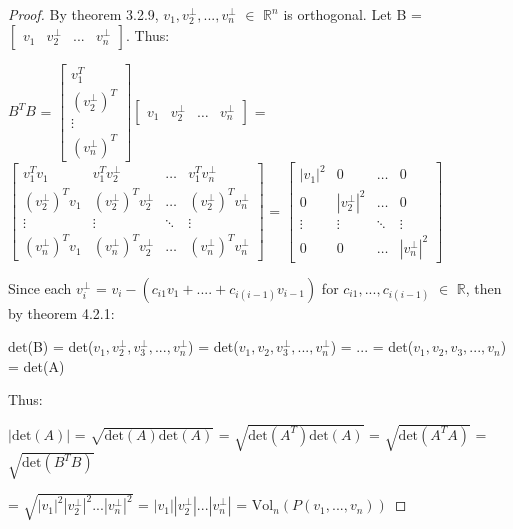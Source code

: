     \begin{proof}
        By {\color{red} theorem 3.2.9},
        $v_1,v_2^{\perp},...,v_n^{\perp}$ $\in$ $\mathbb{R}^n$
        is orthogonal.
        Let B =
        $\begin{bmatrix}
            v_1 & v_2^{\perp} & ... & v_n^{\perp}
        \end{bmatrix}$. Thus:

        \hspace{0.5cm}
        $B^TB$ =
        \scriptsize
        $\begin{bmatrix}
            v_1^T \\
            (v_2^{\perp})^T \\
            \vdots \\
            (v_n^{\perp})^T
        \end{bmatrix}
        \begin{bmatrix}
            v_1 & v_2^{\perp} & \hdots & v_n^{\perp}
        \end{bmatrix}$ =
        $\begin{bmatrix}
            v_1^Tv_1 & v_1^Tv_2^{\perp} & \hdots & v_1^Tv_n^{\perp} \\
            (v_2^{\perp})^Tv_1 & (v_2^{\perp})^Tv_2^{\perp}
                & \hdots & (v_2^{\perp})^Tv_n^{\perp} \\
            \vdots & \vdots & \ddots & \vdots \\
            (v_n^{\perp})^Tv_1 & (v_n^{\perp})^Tv_2^{\perp}
                & \hdots & (v_n^{\perp})^Tv_n^{\perp}
        \end{bmatrix}$ =
        $\begin{bmatrix}
            |v_1|^2 & 0 & \hdots & 0 \\
            0 & |v_2^{\perp}|^2 & \hdots & 0 \\
            \vdots & \vdots & \ddots & \vdots \\
            0 & 0 & \hdots & |v_n^{\perp}|^2
        \end{bmatrix}$
        \normalsize

        Since each $v_i^{\perp}$ = $v_i - (c_{i1}v_1 + .... + c_{i(i-1)}v_{i-1})$
        for $c_{i1},...,c_{i(i-1)}$ $\in$ $\mathbb{R}$, then
        by {\color{red} theorem 4.2.1}:

        \hspace{0.3cm}
        det(B)
        = det($v_1,v_2^{\perp},v_3^{\perp},...,v_n^{\perp}$)
        = det($v_1,v_2,v_3^{\perp},...,v_n^{\perp}$)
        = ...
        = det($v_1,v_2,v_3,...,v_n$)
        = det(A)

        Thus:

        \hspace{0.5cm}
        $|\text{det}(A)|$
        = $\sqrt{\text{det}(A)\text{det}(A)}$
        = $\sqrt{\text{det}(A^T)\text{det}(A)}$
        = $\sqrt{\text{det}(A^TA)}$
        = $\sqrt{\text{det}(B^TB)}$

        \hspace{2.1cm}
        = $\sqrt{|v_1|^2 |v_2^{\perp}|^2 ... |v_n^{\perp}|^2}$
        = $|v_1| |v_2^{\perp}| ... |v_n^{\perp}|$
        = $\text{Vol}_n(P(v_1,...,v_n))$
    \end{proof}

